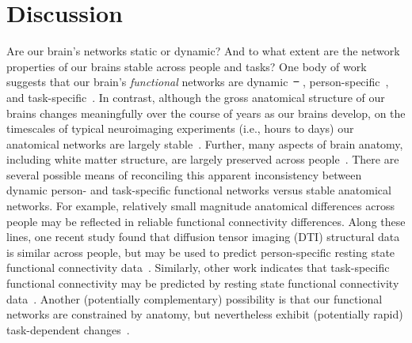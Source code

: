 \documentclass[11pt]{article}
\providecommand{\DIFaddtex}[1]{{\protect\color{blue}\uwave{#1}}} %
\providecommand{\DIFdeltex}[1]{{\protect\color{red}\sout{#1}}}                      %
\providecommand{\DIFaddbegin}{} %
\providecommand{\DIFaddend}{} %
\providecommand{\DIFdelbegin}{} %
\providecommand{\DIFdelend}{} %
\providecommand{\DIFadd}[1]{\texorpdfstring{\DIFaddtex{#1}}{#1}} %
\providecommand{\DIFdel}[1]{\texorpdfstring{\DIFdeltex{#1}}{}} %
\newcommand{\DIFscaledelfig}{0.5}
\newlength{\DIFdelgraphicswidth} %
\newlength{\DIFdelgraphicsheight} %
\newcommand{\DIFaddincludegraphics}[2][]{{\color{blue}\fbox{\DIFOincludegraphics[#1]{#2}}}} %
\newcommand{\DIFdelincludegraphics}[2][]{%
\sbox{\DIFdelgraphicsbox}{\DIFOincludegraphics[#1]{#2}}%
\settoboxwidth{\DIFdelgraphicswidth}{\DIFdelgraphicsbox} %
\settoboxtotalheight{\DIFdelgraphicsheight}{\DIFdelgraphicsbox} %
\scalebox{\DIFscaledelfig}{%
\parbox[b]{\DIFdelgraphicswidth}{\usebox{\DIFdelgraphicsbox}\\[-\baselineskip] \rule{\DIFdelgraphicswidth}{0em}}\llap{\resizebox{\DIFdelgraphicswidth}{\DIFdelgraphicsheight}{%
\setlength{\unitlength}{\DIFdelgraphicswidth}%
\begin{picture}(1,1)%
\thicklines\linethickness{2pt} %
{\color[rgb]{1,0,0}\put(0,0){\framebox(1,1){}}}%
{\color[rgb]{1,0,0}\put(0,0){\line( 1,1){1}}}%
{\color[rgb]{1,0,0}\put(0,1){\line(1,-1){1}}}%
\end{picture}%
}\hspace*{3pt}}} %
} %
\DeclareRobustCommand{\DIFaddbegin}{\DIFOaddbegin \let\includegraphics\DIFaddincludegraphics} %
\DeclareRobustCommand{\DIFaddend}{\DIFOaddend \let\includegraphics\DIFOincludegraphics} %
\DeclareRobustCommand{\DIFdelbegin}{\DIFOdelbegin \let\includegraphics\DIFdelincludegraphics} %
\DeclareRobustCommand{\DIFdelend}{\DIFOaddend \let\includegraphics\DIFOincludegraphics} %
\begin{document}
\DIFaddend \section*{Discussion}
Are our brain's networks static or dynamic?  And to what
extent are the network properties of our brains stable across people and tasks?
One body of work suggests that our brain's \textit{functional} networks are
dynamic~\DIFdelbegin \DIFdel{\mbox{%
\citep[e.g., ][]{MannEtal18}}\hspace{0pt}%
}\DIFdelend \DIFaddbegin \DIFadd{\mbox{%
\citep[e.g., ][]{MannEtal18, OwenEtal19}}\hspace{0pt}%
}\DIFaddend , person-specific~\citep[e.g.,
][]{FinnEtal15}, and task-specific~\citep[e.g., ][]{Turk13}.  In contrast,
although the gross anatomical structure of our brains changes meaningfully over
the course of years as our brains develop, on the timescales of typical
neuroimaging experiments (i.e., hours to days) our anatomical networks are
largely stable~\citep[e.g., ][]{CaseEtal00}.  Further, many aspects of brain
anatomy, including white matter structure, are largely preserved across
people~\citep[e.g., ][]{TalaTour88, JahaEtal13, MoriEtal08}. There are several
possible means of reconciling this apparent inconsistency between dynamic
person- and task-specific functional networks versus stable anatomical networks.
For example, relatively small magnitude anatomical differences across people may
be reflected in reliable functional connectivity differences.  Along these
lines, one recent study found that diffusion tensor imaging (DTI) structural
data is similar across people, but may be used to predict person-specific
resting state functional connectivity data~\citep{BeckEtal18}.  Similarly, other
work indicates that task-specific functional connectivity may be predicted by
resting state functional connectivity data~\citep{ColeEtal16, TavoEtal16}.
Another (potentially complementary) possibility is that our functional networks
are constrained by anatomy, but nevertheless exhibit (potentially rapid)
task-dependent changes~\citep[e.g., ][]{SporBetz16}.
\end{document}
